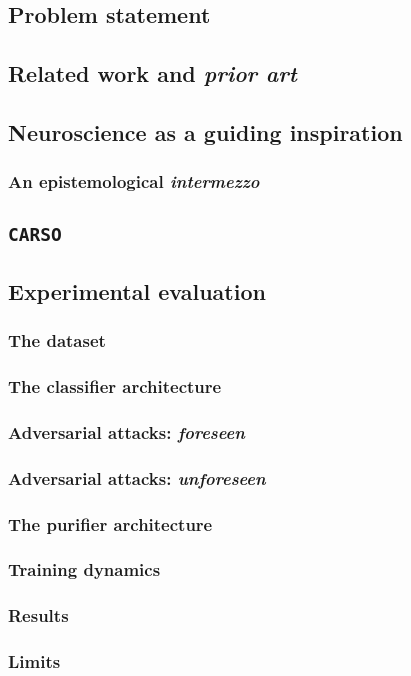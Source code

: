 

\subsection{Problem statement}

\subsection{Related work and \textit{prior art}}

\subsection{Neuroscience as a guiding inspiration}
\subsubsection{An epistemological \textit{intermezzo}}

\subsection{\texttt{CARSO}}

\subsection{Experimental evaluation}
\subsubsection{The dataset}
\subsubsection{The classifier architecture}
\subsubsection{Adversarial attacks: \textit{foreseen}}
\subsubsection{Adversarial attacks: \textit{unforeseen}}
\subsubsection{The purifier architecture}
\subsubsection{Training dynamics}
\subsubsection{Results}
\subsubsection{Limits}